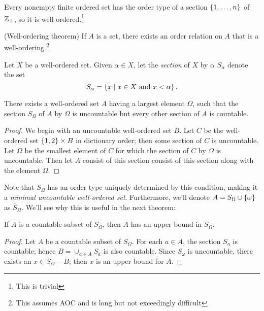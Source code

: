 \documentclass{report}
\begin{document}
\begin{theorem}
  Every nonempty finite ordered set has the order type of a section $\left\{ 1,\dots,n \right\}$ of $\mathbb{Z}_+$, so it is well-ordered.\footnote{This is trivial}
\end{theorem}
 
\begin{theorem}
  {\normalfont (Well-ordering theorem)} If $A$ is a set, there exists an order relation on $A$ that is a well-ordering.\footnote{This assumes AOC and is long but not exceedingly difficult}
\end{theorem}

\begin{definition}
  Let $X$ be a well-ordered set. Given $\alpha \in X$, let the \emph{section} of $X$ by $\alpha$ $S_\alpha$ denote the set
  \[
    S_\alpha = \left\{  x \mid x \in X \text{ and } x < \alpha \right\}.
  \]
\end{definition}

\begin{lemma}
  There exists a well-ordered set $A$ having a largest element $\Omega$, such that the section $S_\Omega$ of $A$ by $\Omega$ is uncountable but every other section of $A$ is countable.
\end{lemma}
\begin{proof}
We begin with an uncountable well-ordered set $B$.
Let  $C$ be the well-ordered set $\left\{ 1,2 \right\} \times B$ in dictionary order; then some section of $C$ is uncountable.
Let $\Omega$ be the smallest element of $C$ for which the section of $C$ by $\Omega$ is uncountable. Then let $A$ consist of this section consist of this section along with the element $\Omega$.
\end{proof}

Note that $S_\Omega$ has an order type uniquely determined by this condition, making it a \emph{minimal uncountable well-ordered set}. 
Furthermore, we'll denote $A = S_\Omega \cup \left\{ \omega \right\}$ as $\overline S_\Omega$.
We'll see why this is useful in the next theorem:
\begin{theorem}
  If $A$ is a countable subset of $S_\Omega$, then $A$ has an upper bound in $S_\Omega$.
\end{theorem}
\begin{proof}
  Let $A$ be a countable subset of $S_\Omega$.
  For each $a \in A$, the section $S_a$ is countable;
  hence $B = \cup_{a \in A} S_a$ is also countable.
  Since $S_\omega$ is uncountable, there exists an $x \in S_\Omega - B$;
  then $x$ is an upper bound for $A$.
\end{proof}
\end{document}
